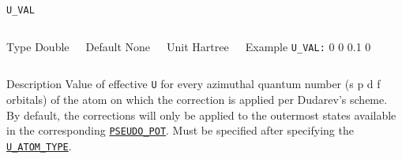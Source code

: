 \documentclass[xcolor=dvipsnames,t]{beamer}
\begin{document}
\begin{frame}[allowframebreaks]{\texttt{U\_VAL}} \label{U_VAL}
\vspace*{-12pt}
\begin{columns}
\begin{block}{Type}
Double
\end{block}

\begin{block}{Default}
None
\end{block}

\begin{block}{Unit}
Hartree
\end{block}

\begin{block}{Example}
\texttt{U\_VAL:} 0 0 0.1 0 \\
\end{block}
\end{columns}

\begin{block}{Description}
Value of effective \texttt{U} for every azimuthal quantum number (s p d f orbitals) of the atom on which the correction is applied per Dudarev's scheme. By default, the corrections will only be applied to the outermost states available in the corresponding \hyperlink{PSEUDO_POT}{\texttt{PSEUDO\_POT}}. Must be specified after specifying the \hyperlink{U_ATOM_TYPE}{\texttt{U\_ATOM\_TYPE}}.
\end{block}

\end{frame}
\end{document}

